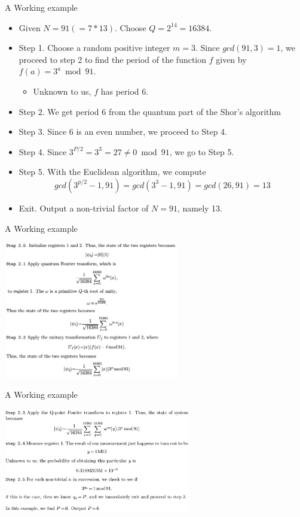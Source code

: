 \begin{frame}{A Working example}

\begin{itemize}
\item
  Given $N=91(=7*13)$. Choose $Q=2^{14}=16384$.
\item
  Step 1. Choose a random positive integer $m=3$. Since $gcd(91,3)=1$,
  we proceed to step 2 to find the period of the function $f$ given by
  $f(a)=3^{a}\bmod{91}$.

  \begin{itemize}
  \itemsep1pt\parskip0pt
  \item
    Unknown to us, $f$ has period 6.
  \end{itemize}
\item
  Step 2. We get period 6 from the quantum part of the Shor's algorithm
\item
  Step 3. Since 6 is an even number, we proceed to Step 4.
\item
  Step 4. Since $3^{P/2}=3^{3}=27\neq 0 \bmod{91}$, we go to Step 5.
\item
  Step 5. With the Euclidean algorithm, we
  compute\[gcd(3^{p/2}-1,91)=gcd(3^{3}-1,91)=gcd(26,91)=13\]
\item
  Exit. Output a non-trivial factor of $N=91$, namely 13.
\end{itemize}

\end{frame}

\begin{frame}{A Working example}

\centerline{\includegraphics[width=3in]{ggg.png}}

\end{frame}

\begin{frame}{A Working example}

\centerline{\includegraphics[width=3.2in]{ggggg.png}}

\end{frame}

